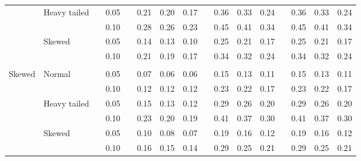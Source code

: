 \documentclass{article} %
\begin{document}
\begin{table}[ht]
\begin{scriptsize}
\begin{center}
\begin{tabular}{ll p{.1cm} c p{.1cm} rrr p{.1cm} rrr p{.1cm} rrr}
             & Heavy tailed && 0.05 &&   0.21 & 0.20 & 0.17 && 0.36 & 0.33 & 0.24 && 0.36 & 0.33 & 0.24 \\ 
             &              && 0.10 &&   0.28 & 0.26 & 0.23 && 0.45 & 0.41 & 0.34 && 0.45 & 0.41 & 0.34 \\ 
             & Skewed       && 0.05 &&   0.14 & 0.13 & 0.10 && 0.25 & 0.21 & 0.17 && 0.25 & 0.21 & 0.17 \\ 
             &              && 0.10 &&   0.21 & 0.19 & 0.17 && 0.34 & 0.32 & 0.24 && 0.34 & 0.32 & 0.24 \\
             &&&&&&&&&&&&&&&\\ 
Skewed       & Normal       && 0.05 &&   0.07 & 0.06 & 0.06 && 0.15 & 0.13 & 0.11 && 0.15 & 0.13 & 0.11 \\ 
             &              && 0.10 &&   0.12 & 0.12 & 0.12 && 0.23 & 0.22 & 0.17 && 0.23 & 0.22 & 0.17 \\ 
             & Heavy tailed && 0.05 &&   0.15 & 0.13 & 0.12 && 0.29 & 0.26 & 0.20 && 0.29 & 0.26 & 0.20 \\ 
             &              && 0.10 &&   0.23 & 0.20 & 0.19 && 0.41 & 0.37 & 0.30 && 0.41 & 0.37 & 0.30 \\ 
             & Skewed       && 0.05 &&   0.10 & 0.08 & 0.07 && 0.19 & 0.16 & 0.12 && 0.19 & 0.16 & 0.12 \\ 
             &              && 0.10 &&   0.16 & 0.15 & 0.14 && 0.29 & 0.25 & 0.21 && 0.29 & 0.25 & 0.21 \\ 


\end{tabular}
\end{center}
\end{scriptsize}
\end{table}
\end{document}
